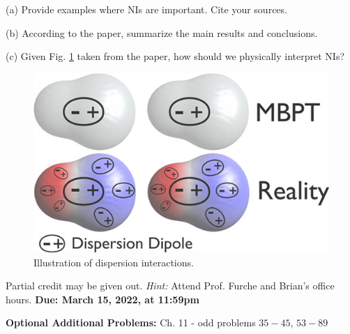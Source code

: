 \documentclass[11pt]{article}
\begin{document}
(a) Provide examples where NIs are important. Cite your sources.

(b) According to the paper, summarize the main results and conclusions.

(c) Given Fig. \ref{fig:nis} taken from the paper, how should we physically interpret NIs?
\begin{figure}[hbpt]
  \centering
  \includegraphics[scale=1.5]{dispersion.jpeg}
  \caption{Illustration of dispersion interactions.}
  \label{fig:nis}
\end{figure}

Partial credit may be given out. \textit{Hint:} Attend Prof. Furche and Brian's office hours.
\textbf{Due: March 15, 2022, at 11:59pm}

\vfill
\textbf{Optional Additional Problems:} Ch. 11 - odd problems $35 - 45$, $53 - 89$
\end{document}
